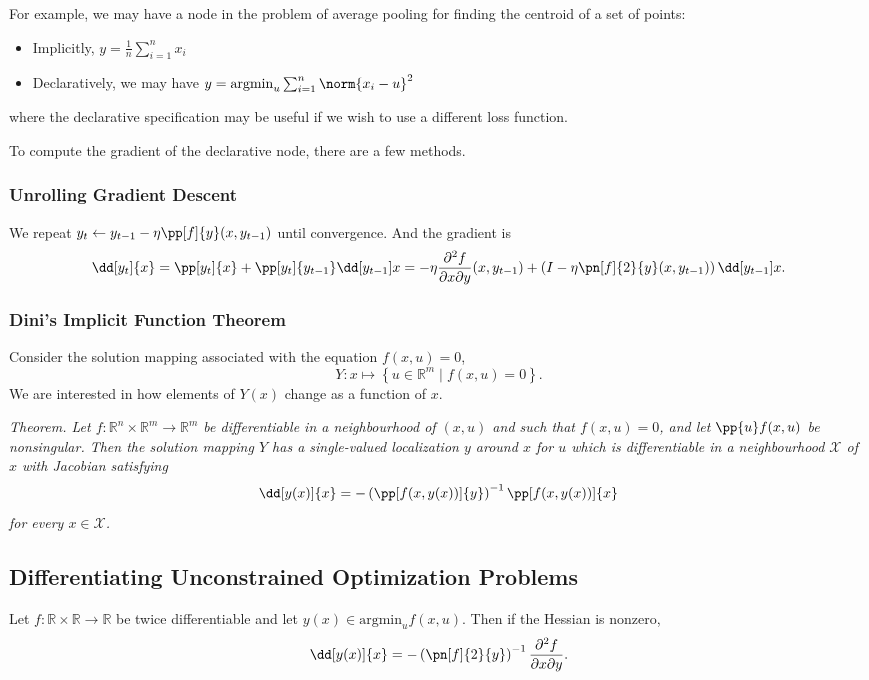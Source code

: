 \documentclass[11pt]{article}
\begin{document}
For example, we may have a node in the problem of average pooling for finding the centroid of a set of points: 
\begin{itemize}
    \item Implicitly, $y = \frac{1}{n}\sum_{i=1}^n x_i$
    \item Declaratively, we may have $y = \mathrm{argmin}_u \sum_{i=1}^n \norm{x_i - u}^2$
\end{itemize}
where the declarative specification may be useful if we wish to use a different loss function. \par
To compute the gradient of the declarative node, there are a few methods.
\subsubsection*{Unrolling Gradient Descent} 
We repeat $y_t \leftarrow y_{t-1} - \eta \pp[f]{y}(x, y_{t-1})$ until convergence. And the gradient is 
\[ \dd[y_t]{x} = \pp[y_t]{x} + \pp[y_t]{y_{t-1}}\dd[y_{t-1}]{x} = -\eta \frac{\partial^2 f}{\partial x\partial y}(x, y_{t-1}) + \left( I - \eta\pn[f]{2}{y}(x, y_{t-1}) \right) \dd[y_{t-1}]{x}. \] 

\subsubsection*{Dini's Implicit Function Theorem}
Consider the solution mapping associated with the equation $f(x, u) = 0$, 
\[ Y: x \mapsto \left\{ u \in \mathbb{R}^m \mid f(x, u) = 0 \right\}. \] 
We are interested in how elements of $Y(x)$ change as a function of $x$. \par 
\emph{Theorem. Let $f: \mathbb{R}^n \times \mathbb{R}^m \rightarrow \mathbb{R}^m$ be differentiable in a neighbourhood of $(x, u)$ and such that $f(x, u) = 0$, and let $\pp{u}f(x, u)$ be nonsingular. Then the solution mapping $Y$ has a single-valued localization $y$ around $x$ for $u$ which is differentiable in a neighbourhood $\mathcal{X}$ of $x$ with Jacobian satisfying 
\[ \dd[y(x)]{x} = -\left( \pp[f(x, y(x))]{y} \right)^{-1} \pp[f(x, y(x))]{x} \] 
for every $x \in \mathcal{X}$.}

\subsection{Differentiating Unconstrained Optimization Problems} 
Let $f: \mathbb{R} \times \mathbb{R} \rightarrow \mathbb{R}$ be twice differentiable and let $y(x) \in \mathrm{argmin}_u f(x, u)$. Then if the Hessian is nonzero, 
\[ \dd[y(x)]{x} = -\left( \pn[f]{2}{y} \right)^{-1} \frac{\partial^2 f}{\partial x\partial y}. \] 
\end{document}
